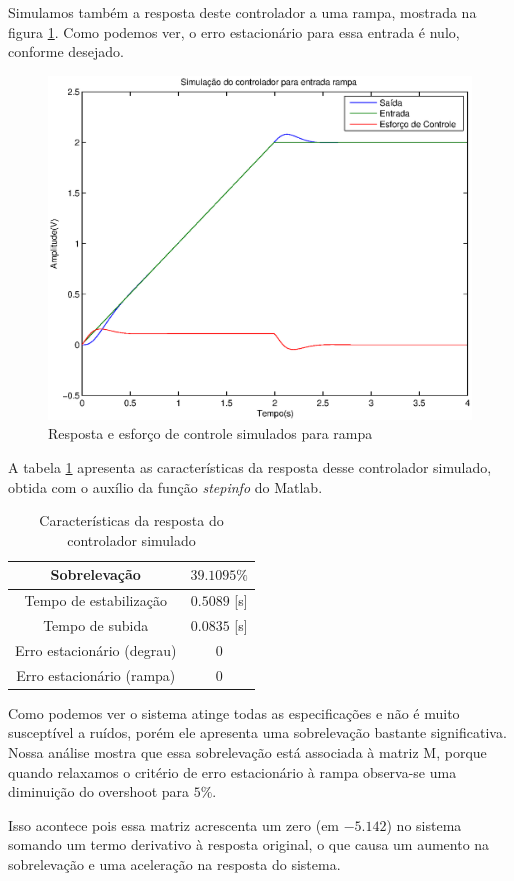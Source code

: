 \documentclass{article}
\begin{document}
Simulamos também a resposta deste controlador a uma rampa, mostrada na figura \ref{fig:yurR}. Como podemos ver, o erro estacionário para essa entrada é nulo, conforme desejado.
\begin{figure}[H]
	\centering
	\includegraphics[width=0.8\linewidth]{../yurR}
	\caption{Resposta e esforço de controle simulados para rampa}
	\label{fig:yurR}
\end{figure}
A tabela \ref{tab:stepinfo} apresenta as características da resposta desse controlador simulado, obtida com o auxílio da função \textit{stepinfo} do Matlab.
\begin{table}[H]
	\centering
	\caption{Características da resposta do controlador simulado}
	\label{tab:stepinfo}
	\begin{tabular}{|c|c|}
		\hline Sobrelevação 				& $39.1095\%$ \\ 
		\hline Tempo de estabilização 		& $0.5089$ [s]\\ 
		\hline Tempo de subida				& $0.0835$ [s]\\ 
		\hline Erro estacionário (degrau) 	& $0$\\ 
		\hline Erro estacionário (rampa) 	& $0$\\ 
		\hline 
	\end{tabular} 
\end{table}

Como podemos ver o sistema atinge todas as especificações e não é muito susceptível a ruídos, porém ele apresenta uma sobrelevação bastante significativa. Nossa análise mostra que essa sobrelevação está associada à matriz M, porque quando relaxamos o critério de erro estacionário à rampa observa-se uma diminuição do overshoot para $5\%$.

Isso acontece pois essa matriz acrescenta um zero (em $- 5.142$) no sistema somando um termo derivativo à resposta original, o que causa um aumento na sobrelevação e uma aceleração na resposta do sistema.
\end{document}
